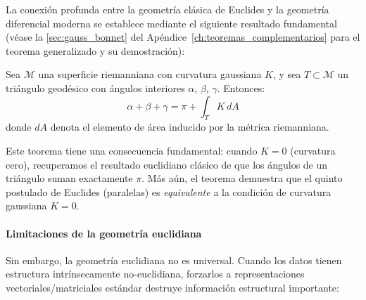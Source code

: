 La conexión profunda entre la geometría clásica de Euclides y la geometría diferencial moderna se establece mediante el siguiente resultado fundamental (véase la \autoref{sec:gauss_bonnet} del Apéndice~\ref{ch:teoremas_complementarios} para el teorema generalizado y su demostración):

\begin{theorem}\label{thm:gauss_bonnet_triangulo}
Sea $\mathcal{M}$ una superficie riemanniana con curvatura gaussiana $K$, y sea $T \subset \mathcal{M}$ un triángulo geodésico con ángulos interiores $\alpha$, $\beta$, $\gamma$. Entonces:
\begin{equation}\label{eq:gauss_bonnet_triangulo}
\alpha + \beta + \gamma = \pi + \int_T K \, dA
\end{equation}
donde $dA$ denota el elemento de área inducido por la métrica riemanniana.
\end{theorem}

Este teorema \citep{lee2018introduction} tiene una consecuencia fundamental: cuando $K = 0$ (curvatura cero), recuperamos el resultado euclidiano clásico de que los ángulos de un triángulo suman exactamente $\pi$. Más aún, el teorema demuestra que el quinto postulado de Euclides (paralelas) es \textit{equivalente} a la condición de curvatura gaussiana $K = 0$.

\paragraph{Limitaciones de la geometría euclidiana}

Sin embargo, la geometría euclidiana no es universal. Cuando los datos tienen estructura intrínsecamente no-euclidiana, forzarlos a representaciones vectoriales/matriciales estándar destruye información estructural importante:

